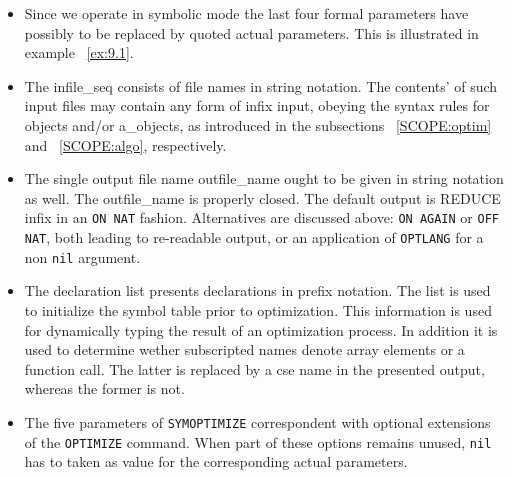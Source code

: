 {\begin{itemize}
The explicit presentation of a subset of the syntax rules for ssetq
is given to suggest that local simplification in symbolic mode can be brought 
in easily by using the assignment operators {\tt lsetq}, {\tt lrsetq} 
and {\tt rsetq}. The algebraic mode equivalent of these operators is
{\tt ::=}, {\tt ::=:} and {\tt :=:}, respectively. Their effect on
simplification is discussed in subsection~\ref{SCOPE:inter} and already 
shown in a number of examples. In addition it is worth noting that 
any (sub)expression
in a lhs\_id or a rhs may contain any number of calls to {\tt eval}. 
These calls lead to simplification of their arguments, prior to optimization.
Details about the use of {\tt eval} are presented in the 
GENTRAN manual~\cite{Gates:91}.
\item Since we operate in symbolic mode the last four formal parameters
have possibly to be replaced by quoted actual parameters. This is illustrated 
in example ~\ref{ex:9.1}.
\item  The infile\_seq consists of  file names in string notation. The contents'
of such input files may contain any form of infix input, obeying the syntax
rules for objects and/or a\_objects, as introduced in the subsections
 ~\ref{SCOPE:optim} and ~\ref{SCOPE:algo}, respectively.
\item The single output file name  outfile\_name ought to be given in string
notation as well. The outfile\_name  is properly closed. The default output
is REDUCE infix in an {\tt ON NAT} fashion. Alternatives are discussed above:
{\tt ON AGAIN} or {\tt OFF NAT}, both leading to re-readable output, or an 
application of {\tt OPTLANG} for a non {\tt nil} argument.
\item The declaration list presents declarations in prefix notation. The list
is used to initialize the symbol table prior to optimization. This 
information is used for dynamically typing  the result of an optimization
process. In addition it is used to determine wether subscripted names denote
array elements or a function call. The latter is replaced by a cse name in the
presented output, whereas the former is not.
\item  The five parameters of {\tt SYMOPTIMIZE} correspondent with optional
extensions of the {\tt OPTIMIZE} command. When part of these options remains
unused, {\tt nil} has to taken as value for the corresponding actual parameters.
\end{itemize}

}
